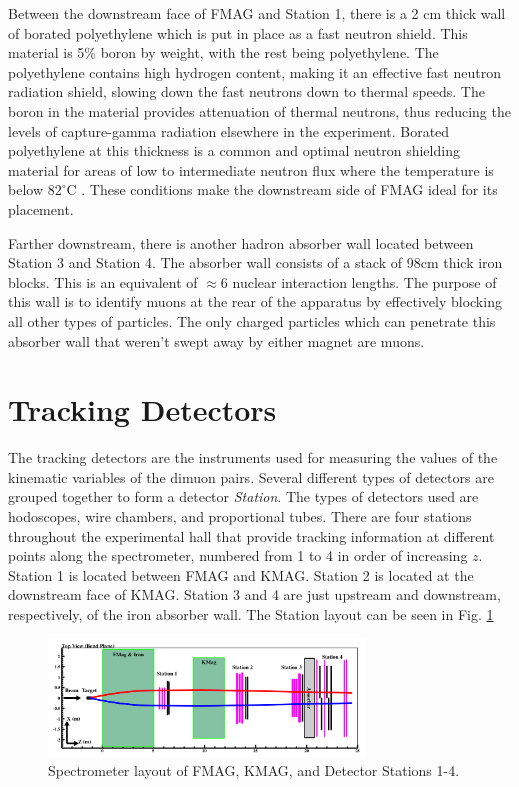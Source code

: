 Between the downstream face of FMAG and Station 1, there is a 2 cm thick wall of borated polyethylene which is put in place as a fast neutron shield. This material is 5\% boron by weight, with the rest being polyethylene. The polyethylene contains high hydrogen content, making it an effective fast neutron radiation shield, slowing down the fast neutrons down to thermal speeds. The boron in the material provides attenuation of thermal neutrons, thus reducing the levels of capture-gamma radiation elsewhere in the experiment. Borated polyethylene at this thickness is a common and optimal neutron shielding material for areas of low to intermediate neutron flux where the temperature is below $82^\circ$C \CN. These conditions make the downstream side of FMAG ideal for its placement.

Farther downstream, there is another hadron absorber wall located between Station 3 and Station 4. The absorber wall consists of a stack of 98cm thick iron blocks. This is an equivalent of $\approx 6$ nuclear interaction lengths. The purpose of this wall is to identify muons at the rear of the apparatus by effectively blocking all other types of particles. The only charged particles which can penetrate this absorber wall that weren't swept away by either magnet are muons.

\section{Tracking Detectors}

The tracking detectors are the instruments used for measuring the values of the kinematic variables of the dimuon pairs. Several different types of detectors are grouped together to form a detector \emph{Station}. The types of detectors used are hodoscopes, wire chambers, and proportional tubes. There are four stations throughout the experimental hall that provide tracking information at different points along the spectrometer, numbered from 1 to 4 in order of increasing $z$. Station 1 is located between FMAG and KMAG. Station 2 is located at the downstream face of KMAG. Station 3 and 4 are just upstream and downstream, respectively, of the iron absorber wall. The Station layout can be seen in Fig. \ref{fig:stations}

\begin{figure}
	\centering
	\includegraphics[width=0.75\textwidth]{figures/apparatus/stations.png}
	\caption{Spectrometer layout of FMAG, KMAG, and Detector Stations 1-4.}
	\label{fig:stations}
\end{figure}


